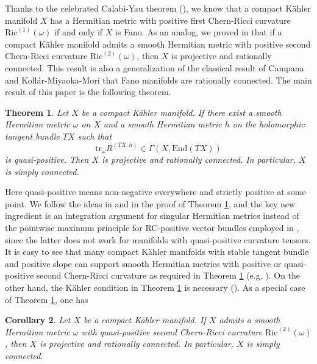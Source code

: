 \documentclass[11pt]{amsart}
\theoremstyle{plain}
\newtheorem{thm}{Theorem}[section]
\newtheorem{cor}[thm]{Corollary}
\theoremstyle{definition}
\newcommand{\btheorem}{\begin{thm}}
\newcommand{\etheorem}{\end{thm}}
\newcommand{\bcorollary}{\begin{cor}}
\newcommand{\ecorollary}{\end{cor}}
\renewcommand{\>}{\rightarrow}
\numberwithin{equation}{section} %
\begin{document}
	Thanks to the celebrated Calabi-Yau theorem (\cite{Yau1978}),  we know that  a
	compact K\"ahler manifold $X$ has a Hermitian metric with positive first Chern-Ricci curvature $\mathrm{Ric}^{(1)}(\omega)$
	if and only if $X$ is Fano. As an analog, we proved in \cite{Yang2018} that if a compact K\"ahler manifold
	admits a smooth Hermitian metric with positive second Chern-Ricci curvature $\mathrm{Ric}^{(2)}(\omega)$, then $X$ is projective and rationally connected. This result is also a generalization of the classical result of Campana \cite{Campana1992} and Koll\'ar-Miyaoka-Mori \cite{KollarMiyaokaMori1992} that Fano manifolds are rationally connected. The main result of this paper is the following theorem. 
	
	
	
	
	
		\btheorem\label{thm:quasipositivesecondchernriccirationallyconnected} Let $X$ be a compact K\"ahler manifold. If there exist a smooth Hermitian metric $\omega$ on $X$ and a smooth Hermitian metric $h$ on the holomorphic tangent bundle $TX$ such that  $$\mathrm{tr}_\omega R^{(TX,h)}\in \Gamma(X, \mathrm{End}(TX))$$ is quasi-positive. Then $X$ is projective and rationally connected. In particular, $X$ is simply connected.
	\etheorem
\noindent Here quasi-positive means non-negative everywhere and strictly positive at some point.  We follow the ideas in \cite{Campana2015a} and \cite{Graber2003} in the proof of Theorem \ref{thm:quasipositivesecondchernriccirationallyconnected}, and the key new ingredient is an integration argument  for singular Hermitian metrics instead of the pointwise maximum principle for RC-positive vector bundles employed in \cite{Yang2018}, since the latter does not work for manifolds with quasi-positive curvature tensors. It is easy to see that many compact K\"ahler manifolds with stable tangent bundle and positive slope can support smooth Hermitian metrics with positive or quasi-positive second Chern-Ricci curvature as required in Theorem \ref{thm:quasipositivesecondchernriccirationallyconnected} (e.g. \cite{UhlenbeckYau1986,Donaldson1987}). On the other hand, the K\"ahler condition in Theorem \ref{thm:quasipositivesecondchernriccirationallyconnected} is necessary (\cite[Section~6]{LiuYang2017}).
As a special case of Theorem \ref{thm:quasipositivesecondchernriccirationallyconnected}, one has



	\bcorollary \label{quasipositivesecondchernriccirationallyconnected} Let $X$ be a compact K\"ahler manifold. If $X$
	admits a smooth Hermitian metric $\omega$ with quasi-positive second Chern-Ricci curvature $\mathrm{Ric}^{(2)}(\omega)$, then $X$ is projective and rationally connected. In particular, $X$ is simply connected.
	\ecorollary
	
\end{document}
